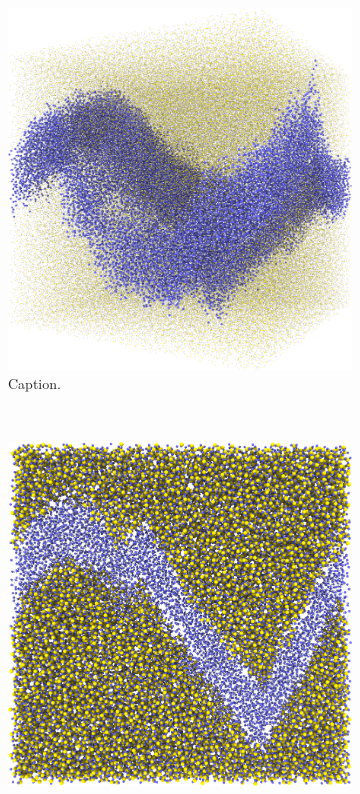 \begin{figure}[htpb]
\begin{subfigure}[b]{\myfigwidth}
        \includegraphics[width=\textwidth]{images/systems/trimmed-rough_fracture05_04}%
        \caption{Caption.}%
    \end{subfigure}%
    \\%
    \begin{subfigure}[b]{\myfigwidth}%
        \centering%
        \includegraphics[width=\textwidth]{images/systems/trimmed-rough_fracture05_02_20ang}%

\end{subfigure}
\end{figure}
